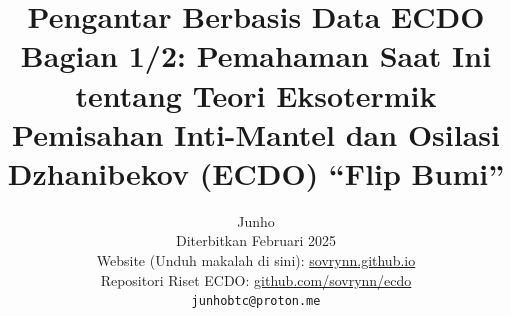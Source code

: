 \documentclass[10pt,twocolumn,letterpaper]{article}
\begin{document}
\title{Pengantar Berbasis Data ECDO Bagian 1/2: Pemahaman Saat Ini tentang Teori Eksotermik Pemisahan Inti-Mantel dan Osilasi Dzhanibekov (ECDO) “Flip Bumi”}

\author{Junho\\
Diterbitkan Februari 2025\\
Website (Unduh makalah di sini): \href{https://sovrynn.github.io}{sovrynn.github.io}\\
Repositori Riset ECDO: \href{https://github.com/sovrynn/ecdo}{github.com/sovrynn/ecdo}\\

{\tt\small junhobtc@proton.me}
}

\maketitle
\end{document}
